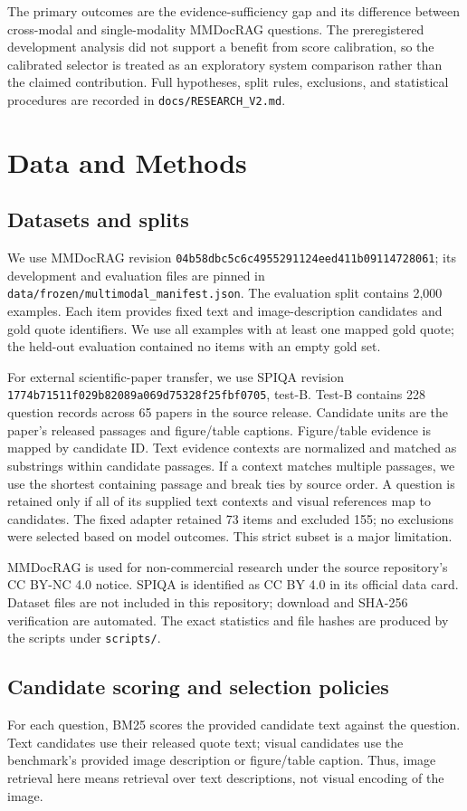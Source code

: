\documentclass[11pt]{article}
\begin{document}
The primary outcomes are the evidence-sufficiency gap and its difference between cross-modal and single-modality MMDocRAG questions. The preregistered development analysis did not support a benefit from score calibration, so the calibrated selector is treated as an exploratory system comparison rather than the claimed contribution. Full hypotheses, split rules, exclusions, and statistical procedures are recorded in \texttt{docs/RESEARCH\_V2.md}.

\section{Data and Methods}
\subsection{Datasets and splits}
We use MMDocRAG revision \texttt{04b58dbc5c6c4955291124eed411b09114728061}; its development and evaluation files are pinned in \texttt{data/frozen/multimodal\_manifest.json}. The evaluation split contains 2,000 examples. Each item provides fixed text and image-description candidates and gold quote identifiers. We use all examples with at least one mapped gold quote; the held-out evaluation contained no items with an empty gold set.

For external scientific-paper transfer, we use SPIQA revision \texttt{1774b71511f029b82089a069d75328f25fbf0705}, test-B. Test-B contains 228 question records across 65 papers in the source release. Candidate units are the paper's released passages and figure/table captions. Figure/table evidence is mapped by candidate ID. Text evidence contexts are normalized and matched as substrings within candidate passages. If a context matches multiple passages, we use the shortest containing passage and break ties by source order. A question is retained only if all of its supplied text contexts and visual references map to candidates. The fixed adapter retained 73 items and excluded 155; no exclusions were selected based on model outcomes. This strict subset is a major limitation.

MMDocRAG is used for non-commercial research under the source repository's CC BY-NC 4.0 notice. SPIQA is identified as CC BY 4.0 in its official data card. Dataset files are not included in this repository; download and SHA-256 verification are automated. The exact statistics and file hashes are produced by the scripts under \texttt{scripts/}.

\subsection{Candidate scoring and selection policies}
For each question, BM25 scores the provided candidate text against the question. Text candidates use their released quote text; visual candidates use the benchmark's provided image description or figure/table caption. Thus, image retrieval here means retrieval over text descriptions, not visual encoding of the image.
\end{document}
